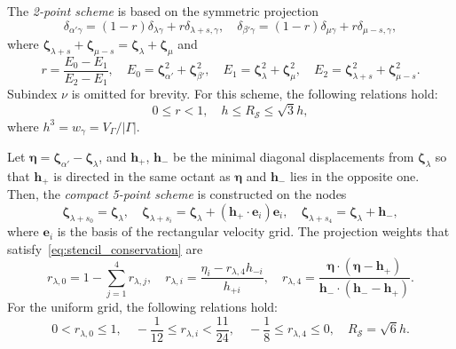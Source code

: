 \documentclass[]{elsarticle} %
\newcommand{\bzeta}{\boldsymbol{\zeta}}
\newcommand{\bh}{\boldsymbol{h}}
\newcommand{\be}{\boldsymbol{e}}
\begin{document}
The \emph{2-point scheme} is based on the symmetric projection
\begin{equation}\label{eq:uniform_projection}
    \delta_{\alpha'\gamma} = (1-r)\delta_{\lambda\gamma} + r\delta_{\lambda+s,\gamma}, \quad
    \delta_{\beta'\gamma} = (1-r)\delta_{\mu\gamma} + r\delta_{\mu-s,\gamma},
\end{equation}
where \(\bzeta_{\lambda+s} + \bzeta_{\mu-s} = \bzeta_{\lambda} + \bzeta_{\mu}\) and
\begin{equation}\label{eq:stencil_weights2}
    r = \frac{E_0-E_1}{E_2-E_1}, \quad
    E_0 = \bzeta_{\alpha'}^2 + \bzeta_{\beta'}^2, \quad
    E_1 = \bzeta_{\lambda}^2 + \bzeta_{\mu}^2, \quad
    E_2 = \bzeta_{\lambda+s}^2 + \bzeta_{\mu-s}^2.
\end{equation}
Subindex \(\nu\) is omitted for brevity.
For this scheme, the following relations hold:
\begin{equation}\label{eq:weights_ranges2}
    0 \leq r < 1, \quad h \leq R_{\mathcal{S}} \leq \sqrt3h,
\end{equation}
where \(h^3 = w_\gamma = V_\Gamma/|\Gamma|\).

Let \(\boldsymbol{\eta} = \bzeta_{\alpha'} - \bzeta_{\lambda}\),
and \(\bh_+\), \(\bh_-\) be the minimal diagonal displacements from \(\bzeta_{\lambda}\)
so that \(\bh_+\) is directed in the same octant as \(\boldsymbol{\eta}\)
and \(\bh_-\) lies in the opposite one.
Then, the \emph{compact 5-point scheme} is constructed on the nodes
\begin{equation}\label{eq:stencil_nodes5}
    \bzeta_{\lambda+s_0} = \bzeta_{\lambda}, \quad
    \bzeta_{\lambda+s_i} = \bzeta_{\lambda} + (\bh_+\cdot \be_i)\be_i, \quad
    \bzeta_{\lambda+s_4} = \bzeta_{\lambda} + \bh_-,
\end{equation}
where \(\be_i\) is the basis of the rectangular velocity grid.
The projection weights that satisfy~\eqref{eq:stencil_conservation} are
\begin{equation}\label{eq:stencil_weights5}
    r_{\lambda,0} = 1 - \sum_{j=1}^4 r_{\lambda,j}, \quad
    r_{\lambda,i} = \frac{\eta_i - r_{\lambda,4}h_{-i}}{h_{+i}}, \quad
    r_{\lambda,4} = \frac{\boldsymbol{\eta}\cdot(\boldsymbol{\eta} - \bh_+)}
        {\bh_-\cdot(\bh_- - \bh_+)}.
\end{equation}
For the uniform grid, the following relations hold:
\begin{equation}\label{eq:weights_ranges5}
    0 < r_{\lambda,0} \leq 1, \quad
    -\frac1{12} \leq r_{\lambda,i} < \frac{11}{24}, \quad
    -\frac18 \leq r_{\lambda,4} \leq 0, \quad
    R_\mathcal{S} = \sqrt6h.
\end{equation}
\end{document}
